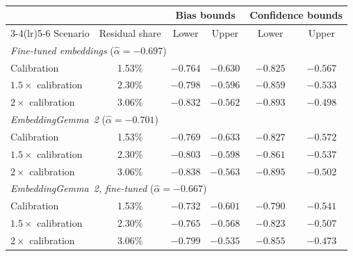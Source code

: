 \begin{table}[!htbp]
\centering
\linespread{1}\selectfont
\RevisionBlue
\caption{}
\label{tab:gemma_sensitivity}
\begin{tabular}{lccccc}
\toprule
 & & \multicolumn{2}{c}{Bias bounds} & \multicolumn{2}{c}{Confidence bounds}\\
\cmidrule(lr){3-4}\cmidrule(lr){5-6}
Scenario & Residual share & Lower & Upper & Lower & Upper\\
\midrule
\multicolumn{6}{l}{\textit{Fine-tuned embeddings} ($\hat\alpha=-0.697$)}\\
Calibration & 1.53\% & $-0.764$ & $-0.630$ & $-0.825$ & $-0.567$\\
$1.5\times$ calibration & 2.30\% & $-0.798$ & $-0.596$ & $-0.859$ & $-0.533$\\
$2\times$ calibration & 3.06\% & $-0.832$ & $-0.562$ & $-0.893$ & $-0.498$\\
\midrule
\multicolumn{6}{l}{\textit{EmbeddingGemma~2} ($\hat\alpha=-0.701$)}\\
Calibration & 1.53\% & $-0.769$ & $-0.633$ & $-0.827$ & $-0.572$\\
$1.5\times$ calibration & 2.30\% & $-0.803$ & $-0.598$ & $-0.861$ & $-0.537$\\
$2\times$ calibration & 3.06\% & $-0.838$ & $-0.563$ & $-0.895$ & $-0.502$\\
\midrule
\multicolumn{6}{l}{\textit{EmbeddingGemma~2, fine-tuned} ($\hat\alpha=-0.667$)}\\
Calibration & 1.53\% & $-0.732$ & $-0.601$ & $-0.790$ & $-0.541$\\
$1.5\times$ calibration & 2.30\% & $-0.765$ & $-0.568$ & $-0.823$ & $-0.507$\\
$2\times$ calibration & 3.06\% & $-0.799$ & $-0.535$ & $-0.855$ & $-0.473$\\
\bottomrule
\end{tabular}
\caption*{\footnotesize {}}
\end{table}


